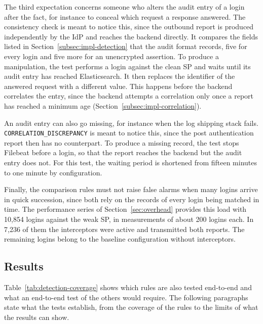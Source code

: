 \documentclass[../main.tex]{subfiles}
\begin{document}
The third expectation concerns someone who alters the audit entry of a login after the fact, for 
instance to conceal which request a response answered. 
The consistency check is meant to notice this, since the outbound report is produced 
independently by the IdP and reaches the backend directly. 
It compares the fields listed in Section~\ref{subsec:impl-detection} that the audit format records, 
five for every login and five more for an unencrypted assertion. 
To produce a manipulation, the test performs a login against the clean SP and waits until its audit 
entry has reached Elasticsearch. 
It then replaces the identifier of the answered request with a different value. 
This happens before the backend correlates the entry, since the backend attempts a correlation only 
once a report has reached a minimum age (Section~\ref{subsec:impl-correlation}). 

An audit entry can also go missing, for instance when the log shipping stack fails. 
\texttt{CORRELATION\_\allowbreak{}DISCREPANCY} is meant to notice this, since the post 
authentication report then has no counterpart. 
To produce a missing record, the test stops Filebeat before a login, so that the report reaches 
the backend but the audit entry does not. 
For this test, the waiting period is shortened from fifteen minutes to one minute by configuration. 

Finally, the comparison rules must not raise false alarms when many logins arrive in quick 
succession, since both rely on the records of every login being matched in time. 
The performance series of Section~\ref{sec:overhead} provides this load with 10{,}854 logins 
against the weak SP, in measurements of about 200 logins each. 
In 7{,}236 of them the interceptors were active and transmitted both reports. 
The remaining logins belong to the baseline configuration without interceptors. 

\subsection{Results}\label{subsec:eval-detection-results}

Table~\ref{tab:detection-coverage} shows which rules are also tested end-to-end and what an end-to-end 
test of the others would require. 
The following paragraphs state what the tests establish, from the coverage of the rules to the 
limits of what the results can show.
\end{document}

